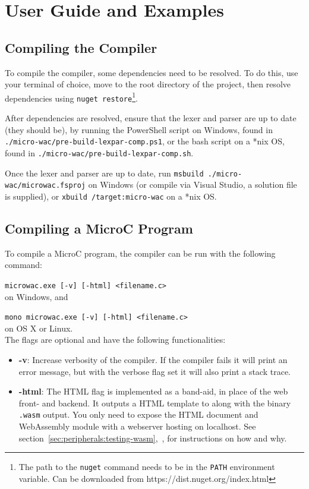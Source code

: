 \documentclass[a4paper]{article}
\begin{document}
\section{User Guide and Examples}
\label{sec:user-guide}

\subsection{Compiling the Compiler}
\label{sec:user-guide:compile-compiler}
To compile the compiler, some dependencies need to be resolved. To do this, use your terminal of choice, move to the root directory of the project, then resolve dependencies using \texttt{nuget restore}\footnote{The path to the \texttt{nuget} command needs to be in the \texttt{PATH} environment variable. Can be downloaded from https://dist.nuget.org/index.html}.

After dependencies are resolved, ensure that the lexer and parser are up to date (they should be), by running the PowerShell script on Windows, found in \texttt{./micro-wac/pre-build-lexpar-comp.ps1}, or the bash script on a *nix OS, found in \texttt{./micro-wac/pre-build-lexpar-comp.sh}.

Once the lexer and parser are up to date, run \texttt{msbuild ./micro-wac/microwac.fsproj} on Windows (or compile via Visual Studio, a solution file is supplied), or \texttt{xbuild /target:micro-wac} on a *nix OS.

\subsection{Compiling a MicroC Program}
\label{sec:user-guide:compile-microc}
To compile a MicroC program, the compiler can be run with the following command:

\texttt{microwac.exe [-v] [-html] <filename.c>}\\
on Windows, and

\texttt{mono microwac.exe [-v] [-html] <filename.c>}\\
on OS X or Linux.\\

\noindent The flags are optional and have the following functionalities:
\begin{itemize}
	\item \textbf{-v}: Increase verbosity of the compiler. If the compiler fails it will print an error message, but with the verbose flag set it will also print a stack trace.
	\item \textbf{-html}: The HTML flag is implemented as a band-aid, in place of the web front- and backend. It outputs a HTML template to along with the binary \texttt{.wasm} output. You only need to expose the HTML document and WebAssembly module with a webserver hosting on localhost. See section~\ref{sec:peripherals:testing-wasm},~, for instructions on how and why.
\end{itemize}
\end{document}
